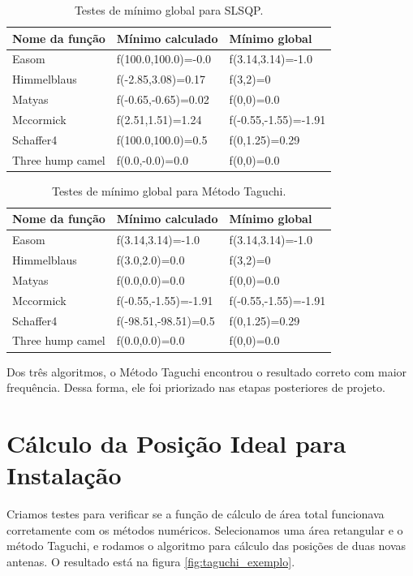 \documentclass[]{politex}
\begin{document}
\begin{table}[H]
\centering
\begin{tabular}{l|l|l}
 Nome da função & Mínimo calculado & Mínimo global \\ \hline
\rowcolor{Gray}
Easom  &  f(100.0,100.0)=-0.0  &  f(3.14,3.14)=-1.0 \\
\rowcolor{Gray}
Himmelblaus  &  f(-2.85,3.08)=0.17  &  f(3,2)=0 \\
\rowcolor{Gray}
Matyas  &  f(-0.65,-0.65)=0.02  &  f(0,0)=0.0 \\
\rowcolor{Gray}
Mccormick  &  f(2.51,1.51)=1.24  &  f(-0.55,-1.55)=-1.91 \\
\rowcolor{Gray}
Schaffer4  &  f(100.0,100.0)=0.5  &  f(0,1.25)=0.29 \\
Three hump camel  &  f(0.0,-0.0)=0.0  &  f(0,0)=0.0 \\
\end{tabular}
\caption{Testes de mínimo global para SLSQP.}
\label{table:test-slsqp}
\end{table}

\begin{table}[H]
\centering
\begin{tabular}{l|l|l}
Nome da função & Mínimo calculado & Mínimo global \\ \hline
Easom  &  f(3.14,3.14)=-1.0  &  f(3.14,3.14)=-1.0 \\
Himmelblaus  &  f(3.0,2.0)=0.0  &  f(3,2)=0 \\
Matyas  &  f(0.0,0.0)=0.0  &  f(0,0)=0.0 \\
Mccormick  &  f(-0.55,-1.55)=-1.91  &  f(-0.55,-1.55)=-1.91 \\
\rowcolor{Gray}
Schaffer4  &  f(-98.51,-98.51)=0.5  &  f(0,1.25)=0.29 \\
Three hump camel  &  f(0.0,0.0)=0.0  &  f(0,0)=0.0 \\
\end{tabular}
\caption{Testes de mínimo global para Método Taguchi.}
\label{table:test-taguchi}
\end{table}

Dos três algoritmos, o Método Taguchi encontrou o resultado correto com maior
frequência. Dessa forma, ele foi priorizado nas etapas posteriores de projeto.

\section{Cálculo da Posição Ideal para Instalação}
Criamos testes para verificar se a função de cálculo de área total funcionava
corretamente com os métodos numéricos.
Selecionamos uma área retangular e o método Taguchi, e rodamos
o algoritmo para cálculo das posições de duas novas antenas. O resultado está
na figura \ref{fig:taguchi_exemplo}.
\end{document}
